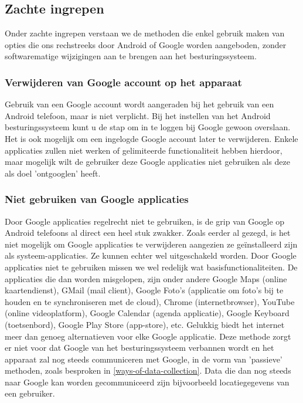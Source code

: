 \subsection{Zachte ingrepen}
\label{softmethods}

Onder zachte ingrepen verstaan we de methoden die enkel gebruik maken van opties die ons rechstreeks door Android of Google worden aangeboden, zonder softwarematige wijzigingen aan te brengen aan het besturingssysteem.

\subsubsection{Verwijderen van Google account op het apparaat}

Gebruik van een Google account wordt aangeraden bij het gebruik van een Android telefoon, maar is niet verplicht. Bij het instellen van het Android besturingssysteem kunt u de stap om in te loggen bij Google gewoon overslaan. Het is ook mogelijk om een ingelogde Google account later te verwijderen. Enkele applicaties zullen niet werken of gelimiteerde functionaliteit hebben hierdoor, maar mogelijk wilt de gebruiker deze Google applicaties niet gebruiken als deze als doel 'ontgooglen' heeft.

\subsubsection{Niet gebruiken van Google applicaties}
Door Google applicaties regelrecht niet te gebruiken, is de grip van Google op Android telefoons al direct een heel stuk zwakker.
Zoals eerder al gezegd, is het niet mogelijk om Google applicaties te verwijderen aangezien ze geïnstalleerd zijn als systeem-applicaties. Ze kunnen echter wel uitgeschakeld worden. Door Google applicaties niet te gebruiken missen we wel redelijk wat basisfunctionaliteiten. De applicaties die dan worden misgelopen, zijn onder andere Google Maps (online kaartendienst), GMail (mail client), Google Foto's (applicatie om foto's bij te houden en te synchroniseren met de cloud), Chrome (internetbrowser), YouTube (online videoplatform), Google Calendar (agenda applicatie), Google Keyboard (toetsenbord), Google Play Store (app-store), etc.  Gelukkig biedt het internet meer dan genoeg alternatieven voor elke Google applicatie. Deze methode zorgt er niet voor dat Google van het besturingssysteem verbannen wordt en het apparaat zal nog steeds communiceren met Google, in de vorm van 'passieve' methoden, zoals besproken in \ref{ways-of-data-collection}. Data die dan nog steeds naar Google kan worden gecommuniceerd zijn bijvoorbeeld locatiegegevens van een gebruiker.

